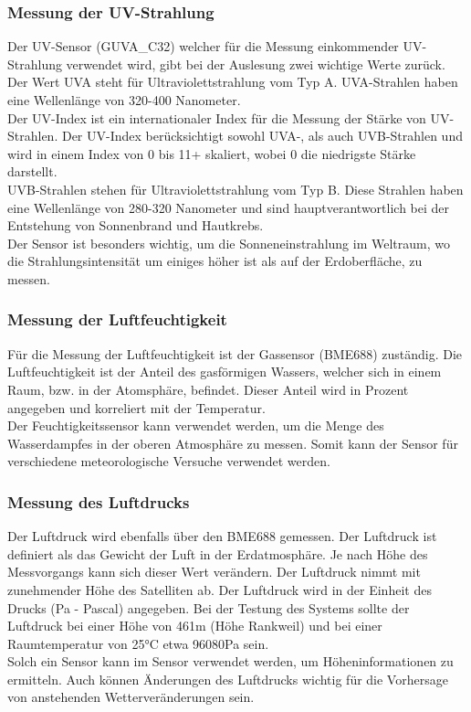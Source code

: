 \subsubsection{Messung der UV-Strahlung}\label{messuv}
Der UV-Sensor (GUVA\_C32) welcher für die Messung einkommender UV-Strahlung verwendet wird, gibt bei der Auslesung zwei wichtige Werte zurück.\\
\vspace{3mm}
Der Wert UVA steht für Ultraviolettstrahlung vom Typ A. UVA-Strahlen haben eine Wellenlänge von 320-400 Nanometer.\\
\vspace{3mm}
Der UV-Index ist ein internationaler Index für die Messung der Stärke von UV-Strahlen. Der UV-Index berücksichtigt sowohl UVA-, als auch UVB-Strahlen und wird in einem Index von 0 bis 11+ skaliert, wobei 0 die niedrigste Stärke darstellt.\\
\vspace{3mm}
UVB-Strahlen stehen für Ultraviolettstrahlung vom Typ B. Diese Strahlen haben eine Wellenlänge von 280-320 Nanometer und sind hauptverantwortlich bei der Entstehung von Sonnenbrand und Hautkrebs.\\
\vspace{3mm}
Der Sensor ist besonders wichtig, um die Sonneneinstrahlung im Weltraum, wo die Strahlungsintensität um einiges höher ist als auf der Erdoberfläche, zu messen. 

\subsubsection{Messung der Luftfeuchtigkeit}
Für die Messung der Luftfeuchtigkeit ist der Gassensor (BME688) zuständig. Die Luftfeuchtigkeit ist der Anteil des gasförmigen Wassers, welcher sich in einem Raum, bzw. in der Atomsphäre, befindet. Dieser Anteil wird in Prozent angegeben und korreliert mit der Temperatur.\\
\vspace{3mm}
Der Feuchtigkeitssensor kann verwendet werden, um die Menge des Wasserdampfes in der oberen Atmosphäre zu messen. Somit kann der Sensor für verschiedene meteorologische Versuche verwendet werden. 

\newpage
\subsubsection{Messung des Luftdrucks}
Der Luftdruck wird ebenfalls über den BME688 gemessen. Der Luftdruck ist definiert als das Gewicht der Luft in der Erdatmosphäre. Je nach Höhe des Messvorgangs kann sich dieser Wert verändern. Der Luftdruck nimmt mit zunehmender Höhe des Satelliten ab. Der Luftdruck wird in der Einheit des Drucks (Pa - Pascal) angegeben. Bei der Testung des Systems sollte der Luftdruck bei einer Höhe von 461m (Höhe Rankweil) und bei einer Raumtemperatur von 25°C etwa 96080Pa sein.\\
\vspace{3mm}
Solch ein Sensor kann im Sensor verwendet werden, um Höheninformationen zu ermitteln. Auch können Änderungen des Luftdrucks wichtig für die Vorhersage von anstehenden Wetterveränderungen sein. 

